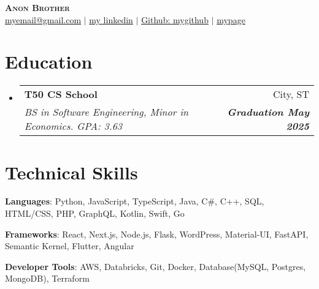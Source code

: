\documentclass[letterpaper,11pt]{article}
\makeatletter
\newcommand{\resumeSubheading}[4]{
  \vspace{-2pt}\item
    \begin{tabular*}{0.97\textwidth}[t]{l@{\extracolsep{\fill}}r}
      \textbf{#1} & #2 \\
      \textit{\small#3} & \textit{\small #4} \\
    \end{tabular*}\vspace{-7pt}
}
\newcommand{\resumeSubHeadingListStart}{\begin{itemize}[leftmargin=0.15in, label={}]}
\newcommand{\resumeSubHeadingListEnd}{\end{itemize}}
\makeatother
\begin{document}

\begin{center}
    \textbf{\Huge \scshape Anon Brother} \\ \vspace{1pt}
    \small \href{myemail@gmail.com}{\underline{myemail@gmail.com}} $|$ 
    \href{my linkedin/}{{my linkedin}} $|$
    \href{https://github.com/mygithub}{\underline{Github: mygithub}} $|$
    \href{https://mypage}{\underline{mypage}}
    
\end{center}


\section{Education}
  \resumeSubHeadingListStart
    \resumeSubheading
      {T50 CS School}{City, ST}
      {BS in Software Engineering, Minor in Economics. GPA: 3.63}{\textbf{Graduation May 2025}}
  \resumeSubHeadingListEnd


\section{Technical Skills}
 \begin{itemize}[leftmargin=0.15in, label={}, itemsep=0pt, parsep=0pt]
    \small{
      \item \textbf{Languages}{: Python, JavaScript, TypeScript, Java, C\#, C++, SQL, HTML/CSS, PHP, GraphQL, Kotlin, Swift, Go}
      \item \textbf{Frameworks}{: React, Next.js, Node.js, Flask, WordPress, Material-UI, FastAPI, Semantic Kernel, Flutter, Angular}
      \item \textbf{Developer Tools}{: AWS, Databricks, Git, Docker, Database(MySQL, Postgres, MongoDB),  Terraform}
    }
 \end{itemize}
\end{document}
